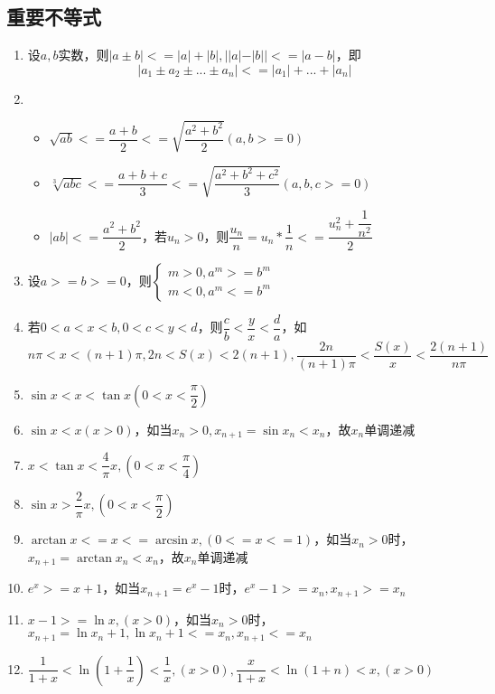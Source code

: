 \subsection{重要不等式}
\begin{enumerate}
    \item 设\(a, b\)实数，则\(|a \pm b| <= |a| + |b|, ||a| - |b|| <= |a - b|\)，即\[|a_1 \pm a_2 \pm ... \pm a_n| <= |a_1| + ... + |a_n|\]
    \item \begin{itemize}
        \item \(\sqrt{ab} <= \dfrac{a + b}{2} <= \sqrt{\dfrac{a^2 + b^2}{2}}(a, b >= 0)\)
        \item \(\sqrt[3]{abc} <= \dfrac{a + b + c}{3} <= \sqrt{\dfrac{a^2 + b^2 + c^2}{3}}(a, b, c >= 0)\)
        \item \(|ab| <= \dfrac{a^2 + b^2}{2}\)，若\(u_n > 0\)，则\(\dfrac{u_n}{n} = u_n * \dfrac{1}{n} <= \dfrac{u_n^2 + \dfrac{1}{n^2}}{2}\)
    \end{itemize}
    \item 设\(a >= b >= 0\)，则\(
    \begin{cases}
    m > 0, a^m >= b^m \\ 
    m < 0, a^m <= b^m
    \end{cases}\)
    \item 若\(0 < a < x < b, 0 < c < y < d\)，则\(\dfrac{c}{b} < \dfrac{y}{x} < \dfrac{d}{a}\)，如\(n\pi < x < (n + 1)\pi, 2n < S(x) < 2(n + 1), \dfrac{2n}{(n + 1)\pi} < \dfrac{S(x)}{x} < \dfrac{2(n + 1)}{n\pi}\)
    \item \(\sin x < x < \tan x(0 < x < \dfrac{\pi}{2})\)
    \item \(\sin x < x(x > 0)\)，如当\(x_n > 0, x_{n + 1} = \sin x_n < x_n\)，故{\(x_n\)}单调递减
    \item \(x < \tan x < \dfrac{4}{\pi}x, (0 < x < \dfrac{\pi}{4})\)
    \item \(\sin x > \dfrac{2}{\pi}x, (0 < x < \dfrac{\pi}{2})\)
    \item \(\arctan x <= x <= \arcsin x, (0 <= x <= 1)\)，如当\(x_n > 0\)时，\(x_{n + 1} = \arctan x_n < x_n\)，故{\(x_n\)}单调递减
    \item \(e^x >= x + 1\)，如当\(x_{n + 1} = e^x - 1\)时，\(e^x - 1 >= x_n, x_{n + 1} >= x_n\)
    \item \(x - 1 >= \ln x, (x > 0)\)，如当\(x_n > 0\)时，\(x_{n + 1} = \ln x_n + 1, \ln x_n + 1 <= x_n, x_{n + 1} <= x_n\)
    \item \(\dfrac{1}{1 + x} < \ln(1 + \dfrac{1}{x}) < \dfrac{1}{x}, (x > 0), \dfrac{x}{1 + x} < \ln(1 + n) < x, (x > 0)\)
\end{enumerate}



